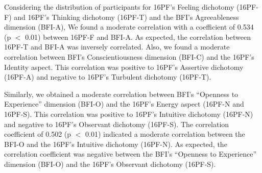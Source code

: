 
Considering the distribution of participants for 16PF's Feeling dichotomy (16PF-F) and 16PF's Thinking dichotomy (16PF-T) and the BFI's Agreeableness dimension (BFI-A), We found a moderate correlation with a coefficient of 0.534 (p $<$ 0.01) between 16PF-F and BFI-A. As expected, the correlation between 16PF-T and BFI-A was inversely correlated. Also, we found a moderate correlation between BFI's Conscientiousness dimension (BFI-C) and the 16PF's Identity aspect. This correlation was positive to 16PF's Assertive dichotomy (16PF-A) and negative to 16PF's Turbulent dichotomy (16PF-T).

Similarly, we obtained a moderate correlation between BFI's ``Openness to Experience'' dimension (BFI-O) and the 16PF's Energy aspect (16PF-N and 16PF-S). This correlation was positive to 16PF's Intuitive dichotomy (16PF-N) and negative to 16PF's Observant dichotomy (16PF-S). The correlation coefficient of 0.502 (p $<$ 0.01) indicated a moderate correlation between the BFI-O and the 16PF's Intuitive dichotomy (16PF-N). As expected, the correlation coefficient was negative between the BFI's ``Openness to Experience'' dimension (BFI-O) and the 16PF's Observant dichotomy (16PF-S).  

